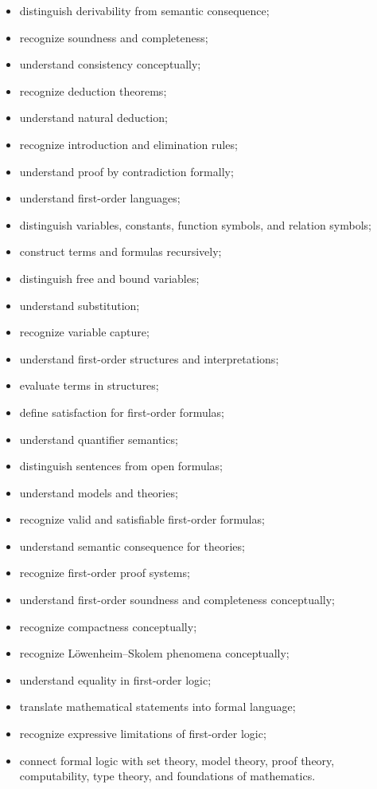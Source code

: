 {\begin{itemize}
    \item distinguish derivability from semantic consequence;
    \item recognize soundness and completeness;
    \item understand consistency conceptually;
    \item recognize deduction theorems;
    \item understand natural deduction;
    \item recognize introduction and elimination rules;
    \item understand proof by contradiction formally;
    \item understand first-order languages;
    \item distinguish variables, constants, function symbols, and relation
          symbols;
    \item construct terms and formulas recursively;
    \item distinguish free and bound variables;
    \item understand substitution;
    \item recognize variable capture;
    \item understand first-order structures and interpretations;
    \item evaluate terms in structures;
    \item define satisfaction for first-order formulas;
    \item understand quantifier semantics;
    \item distinguish sentences from open formulas;
    \item understand models and theories;
    \item recognize valid and satisfiable first-order formulas;
    \item understand semantic consequence for theories;
    \item recognize first-order proof systems;
    \item understand first-order soundness and completeness conceptually;
    \item recognize compactness conceptually;
    \item recognize Löwenheim--Skolem phenomena conceptually;
    \item understand equality in first-order logic;
    \item translate mathematical statements into formal language;
    \item recognize expressive limitations of first-order logic;
    \item connect formal logic with set theory, model theory, proof theory,
          computability, type theory, and foundations of mathematics.
\end{itemize}
}

